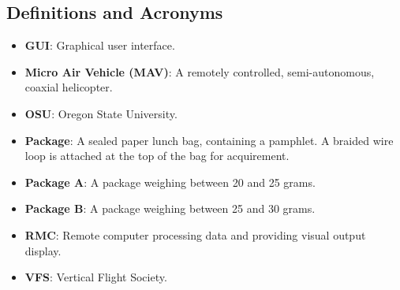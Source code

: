\documentclass[onecolumn, oneside, letterpaper, draftclsnofoot, 10pt, compsoc]{IEEEtran}
\begin{document}
\subsection{Definitions and Acronyms}
\label{sec:defs}
\begin{itemize}
\item \textbf{GUI}: Graphical user interface.
\item \textbf{Micro Air Vehicle (MAV)}: A remotely controlled, semi-autonomous, coaxial helicopter.
\item \textbf{OSU}: Oregon State University.
\item \textbf{Package}: A sealed paper lunch bag, containing a pamphlet. A braided wire loop is attached at the top of the bag for acquirement.
\item \textbf{Package A}: A package weighing between 20 and 25 grams.
\item \textbf{Package B}: A package weighing between 25 and 30 grams.
\item \textbf{RMC}: Remote computer processing data and providing visual output display.
\item \textbf{VFS}: Vertical Flight Society.

\end{itemize}
\end{document}
